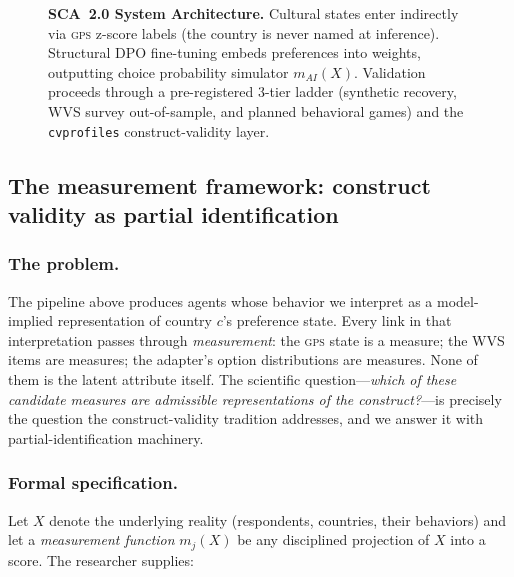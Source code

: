 \documentclass[11pt,letterpaper]{article}
\newcommand{\GPS}{\textsc{gps}}
\newcommand{\cvp}{\texttt{cvprofiles}}
\begin{document}
\begin{figure}[t]
\caption{\textbf{SCA~2.0 System Architecture.} Cultural states enter indirectly via \GPS{} z-score labels (the country is never named at inference). Structural DPO fine-tuning embeds preferences into weights, outputting choice probability simulator $m_{AI}(X)$. Validation proceeds through a pre-registered 3-tier ladder (synthetic recovery, WVS survey out-of-sample, and planned behavioral games) and the \cvp{} construct-validity layer.}
\label{fig:pipeline}
\end{figure}

\subsection{The measurement framework: construct validity as partial identification}

\subsubsection{The problem.}
The pipeline above produces agents whose behavior we interpret as a model-implied representation of country $c$'s preference state. Every link in that interpretation passes through \emph{measurement}: the \GPS{} state is a measure; the WVS items are measures; the adapter's option distributions are measures. None of them is the latent attribute itself. The scientific question---\emph{which of these candidate measures are admissible representations of the construct?}---is precisely the question the construct-validity tradition addresses, and we answer it with partial-identification machinery.

\subsubsection{Formal specification.}
Let $X$ denote the underlying reality (respondents, countries, their behaviors) and let a \emph{measurement function} $m_j(X)$ be any disciplined projection of $X$ into a score. The researcher supplies:
\end{document}

